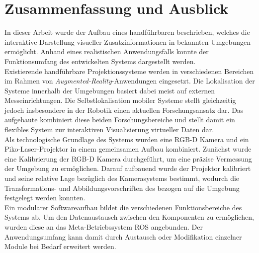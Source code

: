 \chapter{Zusammenfassung und Ausblick}
\label{chap.zusammenfassung}

In dieser Arbeit wurde der Aufbau eines handführbaren \kps{} beschrieben, welches die interaktive Darstellung visueller Zusatzinformationen in bekannten Umgebungen ermöglicht. Anhand eines realistischen Anwendungsfalls konnte der Funktionsumfang des entwickelten Systems dargestellt werden.\\

Existierende handführbare Projektionssysteme werden in verschiedenen Bereichen im Rahmen von \textit{Augmented-Reality}-Anwendungen eingesetzt. Die Lokalisation der Systeme innerhalb der Umgebungen basiert dabei meist auf externen Messeinrichtungen. Die Selbstlokalisation mobiler Systeme stellt gleichzeitig jedoch insbesondere in der Robotik einen aktuellen Forschungsansatz dar. Das aufgebaute \kps{} kombiniert diese beiden Forschungsbereiche und stellt damit ein flexibles System zur interaktiven Visualisierung virtueller Daten dar.\\

Als technologische Grundlage des Systems wurden eine RGB-D Kamera und ein Piko-Laser-Projektor in einem gemeinsamen Aufbau kombiniert. Zunächst wurde eine Kalibrierung der RGB-D Kamera durchgeführt, um eine präzise Vermessung der Umgebung zu ermöglichen. Darauf aufbauend wurde der Projektor kalibriert und seine relative Lage bezüglich des Kamerasystems bestimmt, wodurch die Transformations- und Abbildungsvorschriften des  bezogen auf die Umgebung festgelegt werden konnten.\\

Ein modularer Softwareaufbau bildet die verschiedenen Funktionsbereiche des Systems ab. Um den Datenaustausch zwischen den Komponenten zu ermöglichen, wurden diese an das Meta-Betriebssystem ROS angebunden. Der Anwendungsumfang kann damit durch Austausch oder Modifikation einzelner Module bei Bedarf erweitert werden.\\

